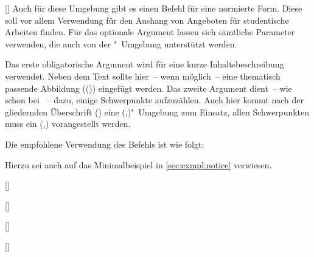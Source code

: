 \begin{Entity*}{}
\begin{Declaration}{%
  [\OList{}]%
}
\printdeclarationlist%
%
Auch für diese Umgebung gibt es einen Befehl für eine normierte Form. Diese 
soll vor allem Verwendung für den Aushang von Angeboten für studentische 
Arbeiten finden. Für das optionale Argument lassen sich sämtliche Parameter 
verwenden, die auch von der "~Umgebung unterstützt werden.

Das erste obligatorische Argument wird für eine kurze Inhaltsbeschreibung 
verwendet. Neben dem Text sollte hier~--  wenn möglich~--  eine thematisch 
passende Abbildung (()) eingefügt 
werden. Das zweite Argument dient~-- wie schon bei ~-- dazu, 
einige Schwerpunkte aufzuzählen. Auch hier kommt nach der gliedernden 
Überschrift () eine 
(,)"~Umgebung zum 
Einsatz, allen Schwerpunkten muss ein 
(,) vorangestellt werden.
\end{Declaration}
%
\begin{Example}
Die empfohlene Verwendung des Befehls  ist wie folgt:
\begin{Code}[escapechar=§]
}{%
  \item Schwerpunkt 1
  \item Schwerpunkt 2
  \item Schwerpunkt 3
}
\end{Code}
Hierzu sei auch auf das Minimalbeispiel in \autoref{sec:exmpl:notice} 
verwiesen.%
%
\end{Example}

\begin{Declaration}[v2.02]{[]}
\begin{Declaration}[v2.02]{[]}
\begin{Declaration}[v2.05]{[]}
\begin{Declaration}{[]}


\end{Declaration}
\end{Declaration}
\end{Declaration}
\end{Declaration}
\end{Entity*}
